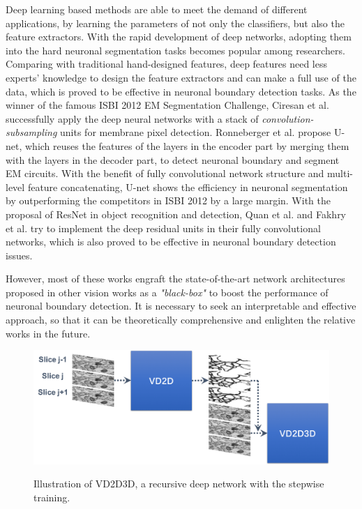 \documentclass[senior]{IPSstyle}
\begin{document}
Deep learning based methods are able to meet the demand of different applications, by learning the parameters of not only the classifiers, but also the feature extractors. With the rapid development of deep networks, adopting them into the hard neuronal segmentation tasks becomes popular among researchers. Comparing with traditional hand-designed features, deep features need less experts' knowledge to design the feature extractors and can make a full use of the data, which is proved to be effective in neuronal boundary detection tasks\cite{Ciresan2012, Ronneberger2015, Quan2016, Fakhry2017, Lee2015}.
As the winner of the famous ISBI 2012 EM Segmentation Challenge\cite{Carreras2015}, Ciresan et al.\cite{Ciresan2012} successfully apply the deep neural networks with a stack of \emph{convolution-subsampling} units for membrane pixel detection. Ronneberger et al.\cite{Ronneberger2015} propose U-net, which reuses the features of the layers in the encoder part by merging them with the layers in the decoder part, to detect neuronal boundary and segment EM circuits. With the benefit of fully convolutional network structure and multi-level feature concatenating, U-net shows the efficiency in neuronal segmentation by outperforming the competitors in ISBI 2012 by a large margin. With the proposal of ResNet\cite{He2016} in object recognition and detection, Quan et al.\cite{Quan2016} and Fakhry et al.\cite{Fakhry2017} try to implement the deep residual units in their fully convolutional networks, which is also proved to be effective in neuronal boundary detection issues. 

However, most of these works engraft the state-of-the-art network architectures proposed in other vision works as a \emph{"black-box"} to boost the performance of neuronal boundary detection. It is necessary to seek an interpretable and effective approach, so that it can be theoretically comprehensive and enlighten the relative works in the future.

\begin{figure}[t]
  \centering
  \includegraphics[width=15cm]{vd2d3d.png}\\
  \caption{Illustration of VD2D3D, a recursive deep network with the stepwise training.}\label{Lee2015}
\end{figure}
\end{document}
